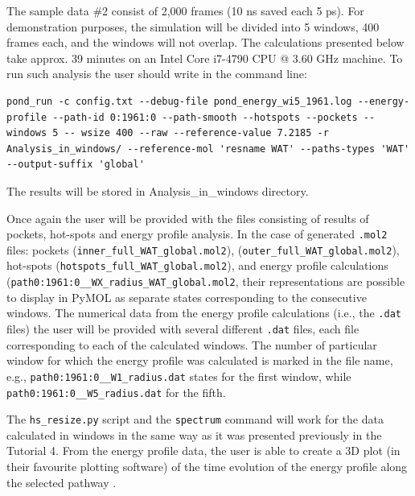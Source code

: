 \documentclass[9pt,tutorial]{livecoms}
\begin{document}
The sample data \#2 consist of 2,000 frames (10 ns saved each 5 ps). For demonstration purposes, the simulation will be divided into 5 windows, 400 frames each, and the windows will not overlap. The calculations presented below take approx. 39 minutes on an Intel Core i7-4790 CPU @ 3.60 GHz machine.
To run such analysis the user should write in the command line:
\begin{lstlisting}
pond_run -c config.txt --debug-file pond_energy_wi5_1961.log --energy-profile --path-id 0:1961:0 --path-smooth --hotspots --pockets --windows 5 -- wsize 400 --raw --reference-value 7.2185 -r Analysis_in_windows/ --reference-mol 'resname WAT' --paths-types 'WAT' --output-suffix 'global'
\end{lstlisting}
The results will be stored in Analysis\_in\_windows directory.

Once again the user will be provided with the files consisting of results of pockets, hot-spots and energy profile analysis. In the case of generated \texttt{.mol2} files: pockets (\texttt{inner\_full\_WAT\_global.mol2}), (\texttt{outer\_full\_WAT\_global.mol2}), \hfill hot-spots (\texttt{hotspots\_full\_WAT\_global.mol2}), \hfill and \newline energy profile calculations \newline (\texttt{path0:1961:0\_\_WX\_radius\_WAT\_global.mol2}, their representations are possible to display in PyMOL as separate states corresponding to the consecutive windows. The numerical data from the energy profile calculations (i.e., the \texttt{.dat} files) the user will be provided with several different \texttt{.dat} files, each file corresponding to each of the calculated windows. The number of particular window for which the energy profile was calculated is marked in the file name, e.g., \texttt{path0:1961:0\_\_W1\_radius.dat} states for the first window, while \texttt{path0:1961:0\_\_W5\_radius.dat} for the fifth.

The \texttt{hs\_resize.py} script and the \texttt{spectrum} command will work for the data calculated in windows in the same way as it was presented previously in the Tutorial 4. From the energy profile data, the user is able to create a 3D plot (in their favourite plotting software) of the time evolution of the energy profile along the selected pathway .
\end{document}
